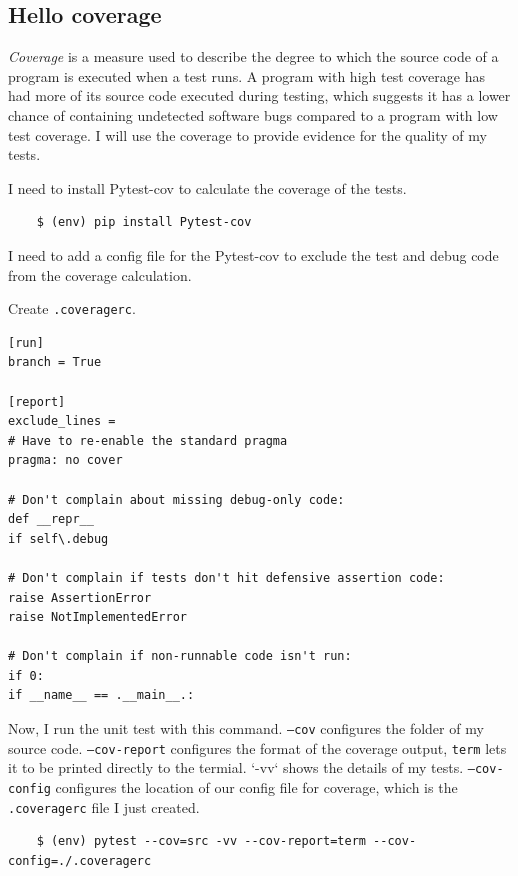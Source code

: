 \documentclass{report}
\begin{document}
\subsection{Hello coverage}

\emph{Coverage} is a measure used to describe the degree to which the source code of a program is executed when a test runs. A program with high test coverage has had more of its source code executed during testing, which suggests it has a lower chance of containing undetected software bugs compared to a program with low test coverage. I will use the coverage to provide evidence for the quality of my tests.

I need to install Pytest-cov to calculate the coverage of the tests.

\begin{verbatim}
    $ (env) pip install Pytest-cov    
\end{verbatim}

I need to add a config file for the Pytest-cov to exclude the test and debug code from the coverage calculation.

Create \texttt{.coveragerc}.

\begin{verbatim}
[run]
branch = True

[report]
exclude_lines =
# Have to re-enable the standard pragma
pragma: no cover

# Don't complain about missing debug-only code:
def __repr__
if self\.debug

# Don't complain if tests don't hit defensive assertion code:
raise AssertionError
raise NotImplementedError

# Don't complain if non-runnable code isn't run:
if 0:
if __name__ == .__main__.:
\end{verbatim}

Now, I run the unit test with this command. \texttt{--cov} configures the folder of my source code. \texttt{--cov-report} configures the format of the coverage output, \texttt{term} lets it to be printed directly to the termial. `-vv` shows the details of my tests. \texttt{--cov-config} configures the location of our config file for coverage, which is the \texttt{.coveragerc} file I just created.

\begin{verbatim}
    $ (env) pytest --cov=src -vv --cov-report=term --cov-config=./.coveragerc
\end{verbatim}
\end{document}
